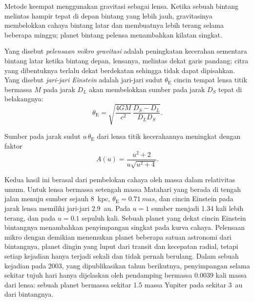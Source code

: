 Metode keempat menggunakan gravitasi sebagai lensa. Ketika sebuah bintang melintas hampir tepat
di depan bintang yang lebih jauh, gravitasinya membelokkan cahaya
bintang latar dan membuatnya lebih terang selama beberapa minggu; planet bintang pelensa
menambahkan kilatan singkat.

\begin{definition}\label{def:b3:exoplanets:microlensing}
Yang disebut \emph{pelensaan mikro gravitasi} adalah
peningkatan kecerahan sementara bintang latar ketika bintang depan, lensanya,
melintas dekat garis pandang; citra yang dibentuknya terlalu dekat
berdekatan sehingga tidak dapat dipisahkan. Yang disebut \emph{jari-jari Einstein}
adalah jari-jari sudut $\theta_\mathrm E$ cincin tempat lensa titik
bermassa $M$ pada jarak $D_L$ akan membelokkan sumber pada jarak $D_S$ tepat
di belakangnya:
\[
\theta_\mathrm E = \sqrt{\frac{4GM}{c^2}\,\frac{D_S - D_L}{D_L D_S}} .
\]
\end{definition}

\begin{proposition}\label{prop:b3:exoplanets:magnification}
Sumber pada jarak sudut $u\,\theta_\mathrm E$ dari lensa titik
kecerahannya meningkat dengan faktor
\[
A(u) = \frac{u^2 + 2}{u\sqrt{u^2 + 4}} .
\]
\end{proposition}

\admitted

    Kedua hasil ini berasal dari pembelokan cahaya oleh massa dalam
    relativitas umum. Untuk lensa bermassa setengah massa Matahari yang berada di tengah jalan menuju sumber
    sejauh \qty{8}{kpc}, $\theta_\mathrm E = \qty{0.71}{mas}$, dan cincin
    Einstein pada jarak lensa memiliki jari-jari \qty{2.9}{au}. Pada
    $u = 1$ sumber menjadi 1.34 kali lebih terang, dan pada $u = 0.1$ sepuluh kali. Sebuah
    planet yang dekat cincin Einstein bintangnya menambahkan penyimpangan singkat pada
    kurva cahaya. Pelensaan mikro dengan demikian menemukan planet beberapa satuan astronomi
    dari bintangnya, planet dingin yang luput dari transit dan kecepatan radial,
    tetapi setiap kejadian hanya terjadi sekali dan tidak pernah berulang. Dalam sebuah kejadian pada 2003,
    yang dipublikasikan tahun berikutnya, penyimpangan selama sekitar tujuh hari
    hanya dijelaskan oleh pendamping bermassa $\num{0.0039}$ kali massa dari
    lensa: sebuah planet bermassa sekitar 1.5 massa Yupiter pada sekitar \qty{3}{au} dari
    bintangnya.

